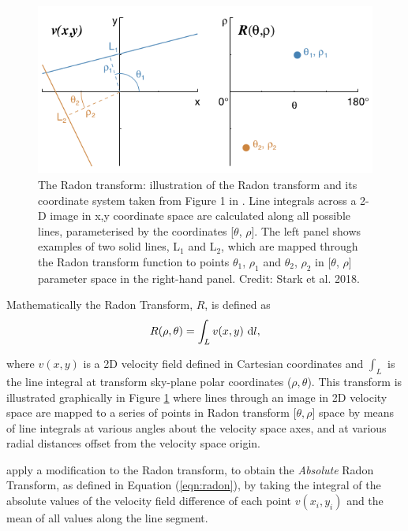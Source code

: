 \begin{figure}
    \centering
    \includegraphics[width=\columnwidth]{images/RadonPlots/Radon-transform-Stark.png}
    \caption[The Radon transform and its coordinate system]{The Radon transform: illustration of the Radon transform and its coordinate system taken from Figure 1 in \citet{2018MNRAS.480.2217S}. Line integrals across a 2-D image in x,y coordinate space are calculated along all possible lines, parameterised by the coordinates [$\theta$, $\rho$]. The left panel shows examples of two solid lines, L$_1$ and L$_2$, which are mapped through the Radon transform function to points $\theta_1$, $\rho_1$ and $\theta_2$, $\rho_2$ in [$\theta$, $\rho$] parameter space in the right-hand panel. Credit: Stark et al. 2018.}
    \label{fig:RadonTransform}
\end{figure}

Mathematically the Radon Transform, $R$, is defined as
\begin{equation}
    \label{eqn:radon}
    R(\rho,\theta)=\int_{L}{v(x,y)\, \mathop{}\!\mathrm{d} l},
\end{equation}

where $v(x,y)$ is a 2D velocity field defined in Cartesian coordinates and $\int_{L}$ is the line integral at transform sky-plane polar coordinates ($\rho,\theta$). This transform is illustrated graphically in Figure \ref{fig:RadonTransform} where lines through an image in 2D velocity space are mapped to a series of points in Radon transform [$\theta,\rho$] space by means of line integrals at various angles about the velocity space axes, and at various radial distances offset from the velocity space origin. 


\citet{2018MNRAS.480.2217S} apply a modification to the Radon transform, to obtain the \textit{Absolute} Radon Transform, as defined in Equation (\ref{eqn:radon}), by taking the integral of the absolute values of the velocity field difference of each point $v(x_i,y_i)$ and the mean of all values along the line segment.

